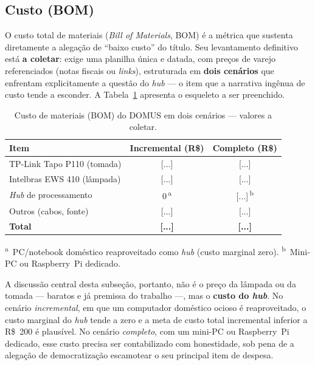 \subsection{Custo (BOM)}\label{sec:res-custo}

O custo total de materiais (\textit{Bill of Materials}, BOM) é a métrica que sustenta
diretamente a alegação de ``baixo custo'' do título. Seu levantamento definitivo está
\textbf{a coletar}: exige uma planilha única e datada, com preços de varejo referenciados
(notas fiscais ou \textit{links}), estruturada em \textbf{dois cenários} que enfrentam
explicitamente a questão do \textit{hub} --- o item que a narrativa ingênua de custo
tende a esconder. A Tabela~\ref{tab:bom} apresenta o esqueleto a ser preenchido.

\begin{table}[H]
\centering
\caption{Custo de materiais (BOM) do DOMUS em dois cenários --- valores a coletar.}
\label{tab:bom}
\begin{tabular}{@{}lcc@{}}
\toprule
\textbf{Item} & \textbf{Incremental (R\$)} & \textbf{Completo (R\$)} \\
\midrule
TP-Link Tapo P110 (tomada)          & [...] & [...] \\
Intelbras EWS 410 (lâmpada)         & [...] & [...] \\
\textit{Hub} de processamento       & 0\,\textsuperscript{a} & [...]\,\textsuperscript{b} \\
Outros (cabos, fonte)               & [...] & [...] \\
\midrule
\textbf{Total}                      & \textbf{[...]} & \textbf{[...]} \\
\bottomrule
\end{tabular}

{\footnotesize\noindent\textsuperscript{a}~PC/notebook doméstico reaproveitado como
\textit{hub} (custo marginal zero). \quad
\textsuperscript{b}~Mini-PC ou Raspberry~Pi dedicado.\par}
\end{table}

A discussão central desta subseção, portanto, não é o preço da lâmpada ou da tomada
--- baratos e já premissa do trabalho ---, mas o \textbf{custo do \textit{hub}}. No
cenário \textit{incremental}, em que um computador doméstico ocioso é reaproveitado, o
custo marginal do \textit{hub} tende a zero e a meta de custo total incremental
inferior a R\$~200 é plausível. No cenário \textit{completo}, com um mini-PC ou
Raspberry~Pi dedicado, esse custo precisa ser contabilizado com honestidade, sob pena
de a alegação de democratização escamotear o seu principal item de despesa.

